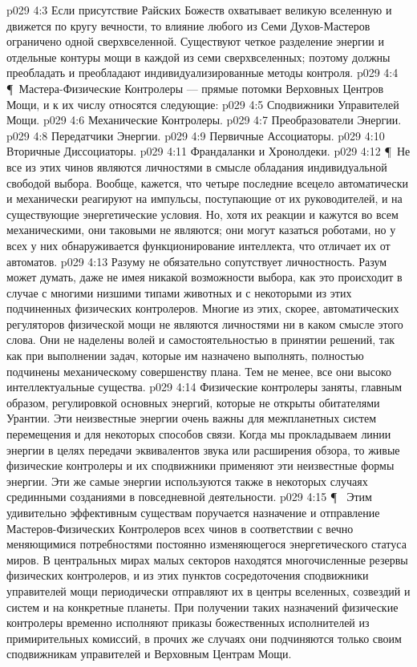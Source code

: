 \vs p029 4:3 Если присутствие Райских Божеств охватывает великую вселенную и движется по кругу вечности, то влияние любого из Семи Духов\hyp{}Мастеров ограничено одной сверхвселенной. Существуют четкое разделение энергии и отдельные контуры мощи в каждой из семи сверхвселенных; поэтому должны преобладать и преобладают индивидуализированные методы контроля.
\vs p029 4:4 \P\ Мастера\hyp{}Физические Контролеры --- прямые потомки Верховных Центров Мощи, и к их числу относятся следующие:
\vs p029 4:5 \bibnobreakspace Сподвижники Управителей Мощи.
\vs p029 4:6 \bibnobreakspace Механические Контролеры.
\vs p029 4:7 \bibnobreakspace Преобразователи Энергии.
\vs p029 4:8 \bibnobreakspace Передатчики Энергии.
\vs p029 4:9 \bibnobreakspace Первичные Ассоциаторы.
\vs p029 4:10 \bibnobreakspace Вторичные Диссоциаторы.
\vs p029 4:11 \bibnobreakspace Франдаланки и Хронолдеки.
\vs p029 4:12 \P\ Не все из этих чинов являются личностями в смысле обладания индивидуальной свободой выбора. Вообще, кажется, что четыре последние всецело автоматически и механически реагируют на импульсы, поступающие от их руководителей, и на существующие энергетические условия. Но, хотя их реакции и кажутся во всем механическими, они таковыми не являются; они могут казаться роботами, но у всех у них обнаруживается функционирование интеллекта, что отличает их от автоматов.
\vs p029 4:13 Разуму не обязательно сопутствует личностность. Разум может думать, даже не имея никакой возможности выбора, как это происходит в случае с многими низшими типами животных и с некоторыми из этих подчиненных физических контролеров. Многие из этих, скорее, автоматических регуляторов физической мощи не являются личностями ни в каком смысле этого слова. Они не наделены волей и самостоятельностью в принятии решений, так как при выполнении задач, которые им назначено выполнять, полностью подчинены механическому совершенству плана. Тем не менее, все они высоко интеллектуальные существа.
\vs p029 4:14 Физические контролеры заняты, главным образом, регулировкой основных энергий, которые не открыты обитателями Урантии. Эти неизвестные энергии очень важны для межпланетных систем перемещения и для некоторых способов связи. Когда мы прокладываем линии энергии в целях передачи эквивалентов звука или расширения обзора, то живые физические контролеры и их сподвижники применяют эти неизвестные формы энергии. Эти же самые энергии используются также в некоторых случаях срединными созданиями в повседневной деятельности.
\vs p029 4:15 \P\ \bibnobreakspace {} Этим удивительно эффективным существам поручается назначение и отправление Мастеров\hyp{}Физических Контролеров всех чинов в соответствии с вечно меняющимися потребностями постоянно изменяющегося энергетического статуса миров. В центральных мирах малых секторов находятся многочисленные резервы физических контролеров, и из этих пунктов сосредоточения сподвижники управителей мощи периодически отправляют их в центры вселенных, созвездий и систем и на конкретные планеты. При получении таких назначений физические контролеры временно исполняют приказы божественных исполнителей из примирительных комиссий, в прочих же случаях они подчиняются только своим сподвижникам управителей и Верховным Центрам Мощи.

